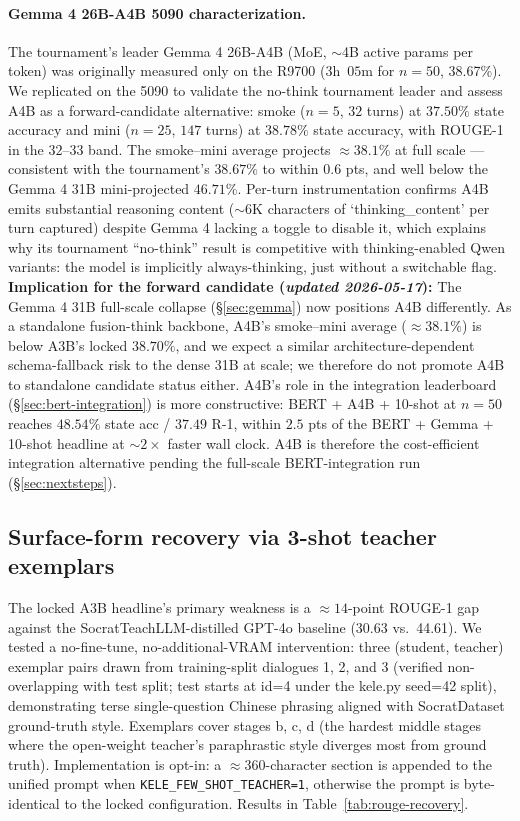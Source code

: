 \documentclass[11pt]{article}
\begin{document}
\paragraph{Gemma 4 26B-A4B 5090 characterization.}
The tournament's leader Gemma 4 26B-A4B (MoE, $\sim$4B active params per token) was originally measured only on the R9700 ($3$h~$05$m for $n{=}50$, 38.67\%). We replicated on the 5090 to validate the no-think tournament leader and assess A4B as a forward-candidate alternative: smoke ($n{=}5$, $32$ turns) at $37.50\%$ state accuracy and mini ($n{=}25$, $147$ turns) at $\mathbf{38.78\%}$ state accuracy, with ROUGE-1 in the $32$--$33$ band. The smoke--mini average projects $\approx 38.1\%$ at full scale --- consistent with the tournament's $38.67\%$ to within $0.6$ pts, and well below the Gemma 4 31B mini-projected $46.71\%$. Per-turn instrumentation confirms A4B emits substantial reasoning content ($\sim$6K characters of `thinking\_content' per turn captured) despite Gemma 4 lacking a toggle to disable it, which explains why its tournament ``no-think'' result is competitive with thinking-enabled Qwen variants: the model is implicitly always-thinking, just without a switchable flag. \textbf{Implication for the forward candidate (\emph{updated 2026-05-17}):} The Gemma 4 31B full-scale collapse (\S\ref{sec:gemma}) now positions A4B differently. As a standalone fusion-think backbone, A4B's smoke--mini average ($\approx 38.1\%$) is below A3B's locked $38.70\%$, and we expect a similar architecture-dependent schema-fallback risk to the dense 31B at scale; we therefore do not promote A4B to standalone candidate status either. A4B's role in the integration leaderboard (\S\ref{sec:bert-integration}) is more constructive: BERT + A4B + 10-shot at $n{=}50$ reaches $48.54\%$ state acc / $37.49$ R-1, within $2.5$ pts of the BERT + Gemma + 10-shot headline at $\sim 2\times$ faster wall clock. A4B is therefore the cost-efficient integration alternative pending the full-scale BERT-integration run (\S\ref{sec:nextsteps}).

\subsection{Surface-form recovery via 3-shot teacher exemplars}
\label{sec:rouge-recovery}

The locked A3B headline's primary weakness is a $\approx 14$-point ROUGE-1 gap against the SocratTeachLLM-distilled GPT-4o baseline (30.63 vs.\ 44.61). We tested a no-fine-tune, no-additional-VRAM intervention: three (student, teacher) exemplar pairs drawn from training-split dialogues 1, 2, and 3 (verified non-overlapping with test split; test starts at id=4 under the kele.py seed=42 split), demonstrating terse single-question Chinese phrasing aligned with SocratDataset ground-truth style. Exemplars cover stages b, c, d (the hardest middle stages where the open-weight teacher's paraphrastic style diverges most from ground truth). Implementation is opt-in: a $\approx 360$-character section is appended to the unified prompt when \texttt{KELE\_FEW\_SHOT\_TEACHER=1}, otherwise the prompt is byte-identical to the locked configuration. Results in Table~\ref{tab:rouge-recovery}.
\end{document}

